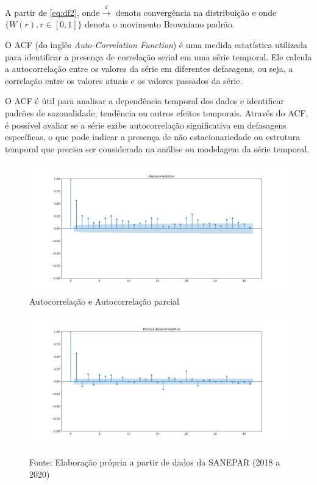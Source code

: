 A partir de \eqref{eq:df2}, onde$\stackrel{d}{\longrightarrow}$ denota convergência na distribuição e onde $\{W(r), r \in[0,1]\}$ denota o movimento Browniano padrão.

O ACF (do inglês \textit{Auto-Correlation Function}) é uma medida estatística utilizada para identificar a presença de correlação serial em uma série temporal. Ele calcula a autocorrelação entre os valores da série em diferentes defasagens, ou seja, a correlação entre os valores atuais e os valores passados da série. 

O ACF é útil para analisar a dependência temporal dos dados e identificar padrões de sazonalidade, tendência ou outros efeitos temporais. Através do ACF, é possível avaliar se a série exibe autocorrelação significativa em defasagens específicas, o que pode indicar a presença de não estacionariedade ou estrutura temporal que precisa ser considerada na análise ou modelagem da série temporal.

\begin{figure}[H]
	\centering
	\caption{Autocorrelação e Autocorrelação parcial}
	\label{fig:acf}
	\includegraphics[width=0.9\linewidth]{Resultados/Figuras/acf} 
	
\end{figure}	
\begin{figure}[H]
	\centering
	\includegraphics[width=0.9\linewidth]{Resultados/Figuras/pacf}
	
	Fonte: Elaboração própria a partir de dados da SANEPAR (2018 a 2020)
\end{figure}

